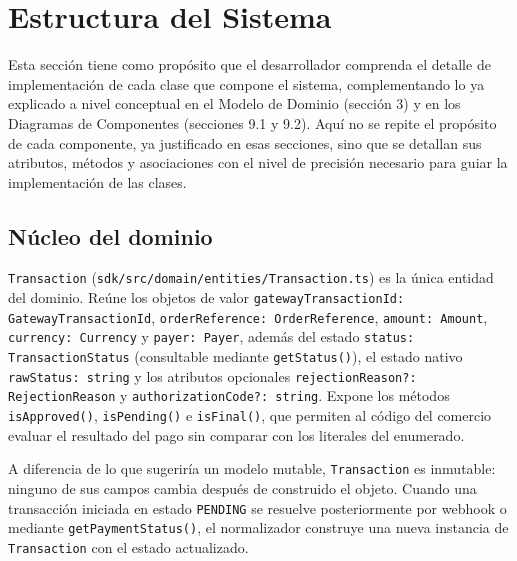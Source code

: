 \section{Estructura del Sistema}
Esta sección tiene como propósito que el desarrollador comprenda el detalle de implementación de cada clase que compone el sistema, complementando lo ya explicado a nivel conceptual en el Modelo de Dominio (sección 3) y en los Diagramas de Componentes (secciones 9.1 y 9.2). Aquí no se repite el propósito de cada componente, ya justificado en esas secciones, sino que se detallan sus atributos, métodos y asociaciones con el nivel de precisión necesario para guiar la implementación de las clases.

\subsection{Núcleo del dominio}
\texttt{Transaction} (\texttt{sdk/src/domain/entities/Transaction.ts}) es la única entidad del dominio. Reúne los objetos de valor \texttt{gatewayTransactionId: GatewayTransactionId}, \texttt{orderReference: OrderReference}, \texttt{amount: Amount}, \texttt{currency: Currency} y \texttt{payer: Payer}, además del estado \texttt{status: TransactionStatus} (consultable mediante \texttt{getStatus()}), el estado nativo \texttt{rawStatus: string} y los atributos opcionales \texttt{rejectionReason?: RejectionReason} y \texttt{authorizationCode?: string}. Expone los métodos \texttt{isApproved()}, \texttt{isPending()} e \texttt{isFinal()}, que permiten al código del comercio evaluar el resultado del pago sin comparar con los literales del enumerado.

A diferencia de lo que sugeriría un modelo mutable, \texttt{Transaction} es inmutable: ninguno de sus campos cambia después de construido el objeto. Cuando una transacción iniciada en estado \texttt{PENDING} se resuelve posteriormente por webhook o mediante \texttt{getPaymentStatus()}, el normalizador construye una nueva instancia de \texttt{Transaction} con el estado actualizado.

